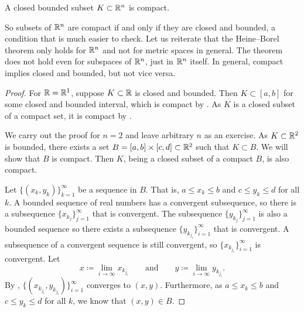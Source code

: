 \begin{thm}%
\label{thm:msbw}
A closed bounded subset $K \subset {\mathbb{R}}^n$ is compact.
\end{thm}

So subsets of ${\mathbb{R}}^n$ are compact if and only if they are closed and bounded,
a condition that is much easier to check.
Let us reiterate that the Heine--Borel theorem only holds for ${\mathbb{R}}^n$ and not
for metric spaces in general.
The theorem does not hold even for subspaces of ${\mathbb{R}}^n$, just in ${\mathbb{R}}^n$
itself.
In general, compact implies closed and
bounded, but not vice versa.

\begin{proof}
For ${\mathbb{R}} = {\mathbb{R}}^1$, suppose $K \subset {\mathbb{R}}$ is closed and bounded.
Then $K \subset [a,b]$ for some closed and bounded interval,
which is compact by .
As $K$ is a closed subset of a compact set,
it is compact by .

We carry out the proof for $n=2$ and leave arbitrary $n$ as an exercise.
As $K \subset {\mathbb{R}}^2$ is bounded, there exists a set
$B=[a,b]\times[c,d] \subset {\mathbb{R}}^2$ such that $K \subset B$.  We will show
that $B$ is compact.  Then $K$, being a closed subset of a compact $B$, is
also compact.  

Let $\bigl\{ (x_k,y_k) \bigr\}_{k=1}^\infty$ be a sequence in $B$.  That is,
$a \leq x_k \leq b$ and
$c \leq y_k \leq d$ for all $k$.  A bounded sequence of real numbers
has a convergent
subsequence, so there is a subsequence $\{ x_{k_j} \}_{j=1}^\infty$
that is convergent.  The subsequence 
$\{ y_{k_j} \}_{j=1}^\infty$ is also a bounded sequence so there exists
a subsequence
$\{ y_{k_{j_i}} \}_{i=1}^\infty$ that is convergent.  A subsequence of a
convergent sequence is still convergent, so 
$\{ x_{k_{j_i}} \}_{i=1}^\infty$ is convergent.
Let
\begin{equation*}
x \coloneqq \lim_{i\to\infty} x_{k_{j_i}}
\qquad \text{and} \qquad
y \coloneqq \lim_{i\to\infty} y_{k_{j_i}} .
\end{equation*}
By ,
$\bigl\{ (x_{k_{j_i}},y_{k_{j_i}}) \bigr\}_{i=1}^\infty$ converges to $(x,y)$.
Furthermore, as $a \leq x_k \leq b$ and
$c \leq y_k \leq d$ for all $k$, we know that $(x,y) \in B$.
\end{proof}

